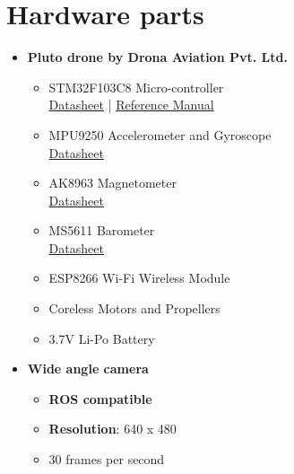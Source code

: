 \documentclass[a4paper,12pt,oneside]{book}
\begin{document}
\section{Hardware parts}
\begin{itemize}
    \item \textbf{Pluto drone by Drona Aviation Pvt. Ltd.}\\
   \begin{itemize}
\item STM32F103C8 Micro-controller\\
\href{https://github.com/eYSIP-2018/Autotuning-of-Controller-For-Drone/blob/master/datasheets/stm32-datasheet.pdf}{Datasheet} | \href{https://github.com/eYSIP-2018/Autotuning-of-Controller-For-Drone/blob/master/datasheets/stm32-ref-manual.pdf}{Reference Manual}

\item MPU9250 Accelerometer and Gyroscope \\
\href{https://github.com/eYSIP-2018/Autotuning-of-Controller-For-Drone/blob/master/datasheets/MPU-9250-Datasheet.pdf}{Datasheet} 

\item AK8963 Magnetometer \\
\href{}{Datasheet} 

\item MS5611 Barometer\\
\href{https://github.com/eYSIP-2018/Autotuning-of-Controller-For-Drone/blob/master/datasheets/stm32-ref-manual.pdf}{Datasheet}

\item ESP8266 Wi-Fi Wireless Module
\item Coreless Motors and Propellers 

\item 3.7V Li-Po Battery \\

\end{itemize}
     \item \textbf{Wide angle camera}
     \begin{itemize}
        \item\textbf{ROS compatible}
         \item \textbf{Resolution}: 640 x 480
         \item 30 frames per second
     \end{itemize}
     

\end{itemize}
\end{document}
